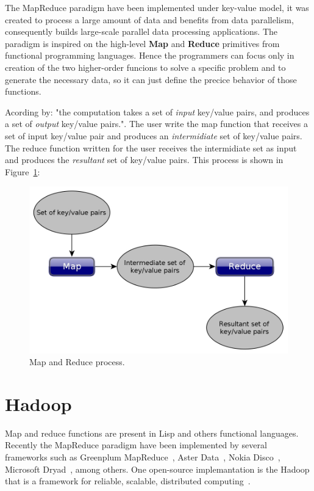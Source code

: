The MapReduce paradigm have been implemented under key-value model, it was created
to process a large amount of data and benefits from data parallelism, consequently
builds large-scale parallel data processing applications. The paradigm is inspired
on the high-level \textbf{Map} and \textbf{Reduce} primitives from functional
programming languages. Hence the programmers can focus only in creation of the two
higher-order funcions to solve a specific problem and to generate the necessary
data, so it can just define the precice behavior of those functions.

Acording by\cite{dean:2008}: "the computation takes a set of \textit{input}
key/value pairs, and produces a set of \textit{output} key/value pairs.". The user
write the map function that receives a set of input key/value pair and produces an
\textit{intermidiate} set of key/value pairs. The reduce function written for the
user receives the intermidiate set as input and produces the \textit{resultant}
set of key/value pairs. This process is shown in Figure~\ref{fig:mapReduce}:

\begin{figure}[htbp]
	\centering
	\includegraphics[width=\columnwidth]{img/mapReduce.jpg}
	\caption{Map and Reduce process.}\label{fig:mapReduce}
\end{figure}

\section{Hadoop}
Map and reduce functions are present in Lisp and others functional languages. Recently
the MapReduce paradigm have been implemented by several frameworks such as Greenplum
MapReduce~\cite{Greenplum:2008}, Aster Data~\cite{Aster:2011}, Nokia
Disco~\cite{Mundkur:2011}, Microsoft Dryad~\cite{Isard:2007}, among others. One
open-source implemantation is the Hadoop that is a framework for reliable,
scalable, distributed computing~\cite{hadoop}.

